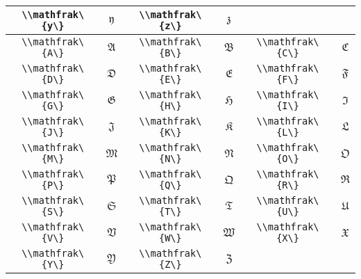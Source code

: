 \begin{table}[htbp]
\begin{tabularx}{\linewidth}{CcCcCc}
		\lstinline|\\mathfrak\{y\}| & \(\mathfrak{y}\) & \lstinline|\\mathfrak\{z\}| & \(\mathfrak{z}\) & & \\
		\midrule
		\lstinline|\\mathfrak\{A\}| & \(\mathfrak{A}\) & \lstinline|\\mathfrak\{B\}| & \(\mathfrak{B}\) & \lstinline|\\mathfrak\{C\}| & \(\mathfrak{C}\) \\
		\lstinline|\\mathfrak\{D\}| & \(\mathfrak{D}\) & \lstinline|\\mathfrak\{E\}| & \(\mathfrak{E}\) & \lstinline|\\mathfrak\{F\}| & \(\mathfrak{F}\) \\
		\lstinline|\\mathfrak\{G\}| & \(\mathfrak{G}\) & \lstinline|\\mathfrak\{H\}| & \(\mathfrak{H}\) & \lstinline|\\mathfrak\{I\}| & \(\mathfrak{I}\) \\
		\lstinline|\\mathfrak\{J\}| & \(\mathfrak{J}\) & \lstinline|\\mathfrak\{K\}| & \(\mathfrak{K}\) & \lstinline|\\mathfrak\{L\}| & \(\mathfrak{L}\) \\
		\lstinline|\\mathfrak\{M\}| & \(\mathfrak{M}\) & \lstinline|\\mathfrak\{N\}| & \(\mathfrak{N}\) & \lstinline|\\mathfrak\{O\}| & \(\mathfrak{O}\) \\
		\lstinline|\\mathfrak\{P\}| & \(\mathfrak{P}\) & \lstinline|\\mathfrak\{Q\}| & \(\mathfrak{Q}\) & \lstinline|\\mathfrak\{R\}| & \(\mathfrak{R}\) \\
		\lstinline|\\mathfrak\{S\}| & \(\mathfrak{S}\) & \lstinline|\\mathfrak\{T\}| & \(\mathfrak{T}\) & \lstinline|\\mathfrak\{U\}| & \(\mathfrak{U}\) \\
		\lstinline|\\mathfrak\{V\}| & \(\mathfrak{V}\) & \lstinline|\\mathfrak\{W\}| & \(\mathfrak{W}\) & \lstinline|\\mathfrak\{X\}| & \(\mathfrak{X}\) \\
		\lstinline|\\mathfrak\{Y\}| & \(\mathfrak{Y}\) & \lstinline|\\mathfrak\{Z\}| & \(\mathfrak{Z}\) & & \\
		\bottomrule
	\end{tabularx}
\end{table}
